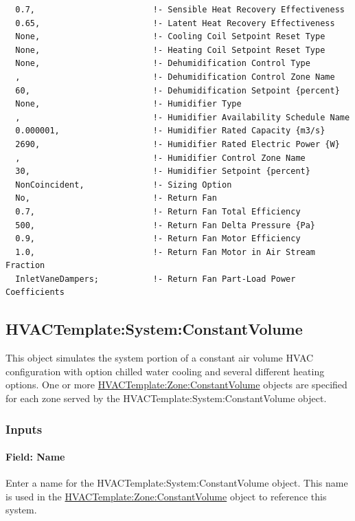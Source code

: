 \begin{lstlisting}
  0.7,                        !- Sensible Heat Recovery Effectiveness
  0.65,                       !- Latent Heat Recovery Effectiveness
  None,                       !- Cooling Coil Setpoint Reset Type
  None,                       !- Heating Coil Setpoint Reset Type
  None,                       !- Dehumidification Control Type
  ,                           !- Dehumidification Control Zone Name
  60,                         !- Dehumidification Setpoint {percent}
  None,                       !- Humidifier Type
  ,                           !- Humidifier Availability Schedule Name
  0.000001,                   !- Humidifier Rated Capacity {m3/s}
  2690,                       !- Humidifier Rated Electric Power {W}
  ,                           !- Humidifier Control Zone Name
  30,                         !- Humidifier Setpoint {percent}
  NonCoincident,              !- Sizing Option
  No,                         !- Return Fan
  0.7,                        !- Return Fan Total Efficiency
  500,                        !- Return Fan Delta Pressure {Pa}
  0.9,                        !- Return Fan Motor Efficiency
  1.0,                        !- Return Fan Motor in Air Stream Fraction
  InletVaneDampers;           !- Return Fan Part-Load Power Coefficients
\end{lstlisting}

\subsection{HVACTemplate:System:ConstantVolume}\label{hvactemplatesystemconstantvolume}

This object simulates the system portion of a constant air volume HVAC configuration with option chilled water cooling and several different heating options. One or more \hyperref[hvactemplatezoneconstantvolume]{HVACTemplate:Zone:ConstantVolume} objects are specified for each zone served by the HVACTemplate:System:ConstantVolume object.

\subsubsection{Inputs}\label{inputs-20-002}

\paragraph{Field: Name}\label{field-name-7-007}

Enter a name for the HVACTemplate:System:ConstantVolume object. This name is used in the \hyperref[hvactemplatezoneconstantvolume]{HVACTemplate:Zone:ConstantVolume} object to reference this system.

